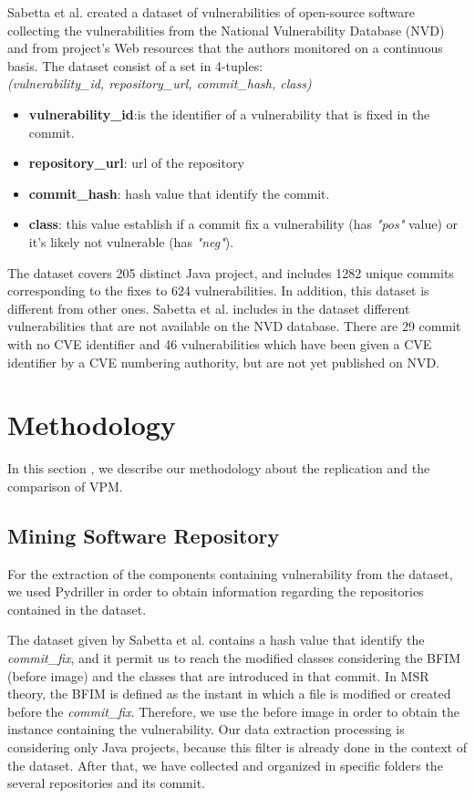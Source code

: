 \documentclass[twocolumn,10pt]{asme2ej}
\begin{document}
Sabetta et al. \cite{Sabetta} created a dataset of vulnerabilities of open-source software collecting the vulnerabilities from the National Vulnerability Database (NVD) and from project's Web resources that the authors monitored on a continuous basis.
The dataset consist of a set in 4-tuples:\\

\textit{(vulnerability\_id, repository\_url, commit\_hash, class)}
\begin{itemize}
    \item \textbullet \textbf{vulnerability\_id}:is the identifier of a vulnerability that is fixed in the commit.
    \item \textbullet \textbf{repository\_url}: url of the repository
    \item \textbullet \textbf{commit\_hash}:  hash value that identify the commit.
    \item \textbullet \textbf{class}: this value establish if a commit fix a vulnerability (has \textit{"pos"} value) or it's likely not vulnerable (has \textit{"neg"}).
\end{itemize}
The dataset covers 205 distinct Java project, and includes 1282 unique commits corresponding to the fixes to 624 vulnerabilities. In addition, this dataset is different from other ones. Sabetta et al. includes in the dataset different vulnerabilities that are not available on the NVD database. There are 29 commit with no CVE identifier and 46 vulnerabilities which have been given a CVE identifier by a CVE numbering authority, but are not yet published on NVD.


\section{Methodology}
\label{Methodology}
In this section , we describe our methodology about the replication and the comparison of VPM.

\subsection{Mining Software Repository}
For the extraction of the components containing vulnerability from the dataset, we used Pydriller \cite{Spadini} \cite{Spadini_PyDrillerRepo} in order to obtain information regarding the repositories contained in the dataset.


The dataset given by Sabetta et al.\cite{Sabetta} contains a hash value that identify the \textit{commit\_fix}, and it permit us to reach the modified classes considering the BFIM (before image) and the classes that are introduced in that commit. In MSR theory, the BFIM is defined as the instant in which a file is modified or created before the \textit{commit\_fix}. Therefore, we use the before image in order to obtain the instance containing the vulnerability.
Our data extraction processing is considering only Java projects, because this filter is already done in the context of the dataset. 
After that, we have collected and organized in specific folders the several repositories and its commit.
\end{document}
